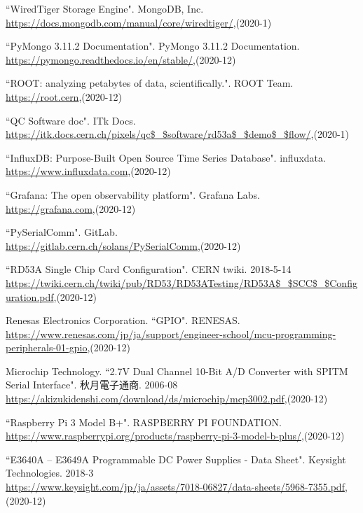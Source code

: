 \begin{thebibliography}{9}
``WiredTiger Storage Engine". MongoDB, Inc. \\
\url{https://docs.mongodb.com/manual/core/wiredtiger/},(2020-1)

``PyMongo 3.11.2 Documentation". PyMongo 3.11.2 Documentation.\\
\url{https://pymongo.readthedocs.io/en/stable/},(2020-12)

``ROOT: analyzing petabytes of data, scientifically.". ROOT Team.\\ 
\url{https://root.cern},(2020-12)

``QC Software doc". ITk Docs. \\
\url{https://itk.docs.cern.ch/pixels/qc$\_$software/rd53a$\_$demo$\_$flow/},(2020-1)

``InfluxDB: Purpose-Built Open Source Time Series Database". influxdata. \\
\url{https://www.influxdata.com},(2020-12)

``Grafana: The open observability platform". Grafana Labs. \\
\url{https://grafana.com},(2020-12)

``PySerialComm". GitLab. \\
\url{https://gitlab.cern.ch/solans/PySerialComm},(2020-12)

``RD53A Single Chip Card Configuration". CERN twiki. 2018-5-14 \\
\url{https://twiki.cern.ch/twiki/pub/RD53/RD53ATesting/RD53A$\_$SCC$\_$Configuration.pdf},(2020-12)

Renesas Electronics Corporation. ``GPIO". RENESAS.  \\
\url{https://www.renesas.com/jp/ja/support/engineer-school/mcu-programming-peripherals-01-gpio},(2020-12)

Microchip Technology. ``2.7V Dual Channel 10-Bit A/D Converter with SPITM Serial Interface". 秋月電子通商. 2006-08\\
\url{https://akizukidenshi.com/download/ds/microchip/mcp3002.pdf},(2020-12)

``Raspberry Pi 3 Model B+". RASPBERRY PI FOUNDATION. \\
\url{https://www.raspberrypi.org/products/raspberry-pi-3-model-b-plus/},(2020-12)

``E3640A – E3649A Programmable DC Power Supplies - Data Sheet". Keysight Technologies. 2018-3\\
\url{https://www.keysight.com/jp/ja/assets/7018-06827/data-sheets/5968-7355.pdf},(2020-12)


\end{thebibliography}
